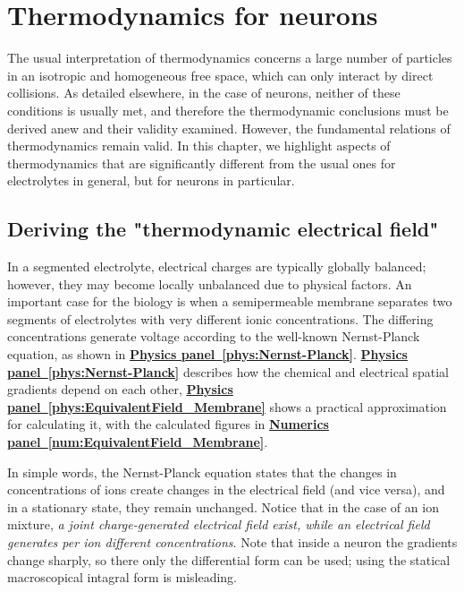 
\chapter{Thermodynamics for neurons\label{ch:Thermodynamics}}
\iflatexml
\else
\minitoc
\fi


The usual interpretation of thermodynamics concerns a large number of particles in an isotropic and homogeneous free space, which can only interact by direct collisions. As detailed elsewhere, in the case of neurons, neither of these conditions is usually met, and therefore the thermodynamic conclusions must be derived anew and their validity examined. However, the fundamental relations of thermodynamics remain valid. In this chapter, we highlight aspects of thermodynamics that are significantly different from the usual ones for electrolytes in general, but for neurons in particular.

\section[Thermodynamic field]{Deriving the "thermodynamic electrical field"\label{sec:Physics-ThermodynamicField}}

In a segmented electrolyte, electrical charges are typically globally balanced;
however, they may become locally unbalanced due to physical factors.
An important case for the biology is when a semipermeable membrane
separates two segments of electrolytes with very different ionic concentrations. 
The differing concentrations generate voltage according to the 
well-known  Nernst-Planck equation, as shown in
\hyperlink{phys:Nernst-Planck}
{\textbf{Physics panel~\ref{phys:Nernst-Planck}}}.
\hyperlink{phys:Nernst-Planck}
{\textbf{Physics panel~\ref{phys:Nernst-Planck}}}
describes how the chemical and
electrical spatial gradients depend on each other,
\hyperlink{phys:EquivalentField_Membrane}
{\textbf{Physics panel~\ref{phys:EquivalentField_Membrane}}}
shows a practical approximation for calculating it, with 
the calculated figures in 
\hyperlink{num:EquivalentField_Membrane}
{\textbf{Numerics panel~\ref{num:EquivalentField_Membrane}}}.


In simple words, the Nernst-Planck equation states that the changes in
concentrations of ions create changes in the electrical field (and
vice versa), and in a stationary state, they remain unchanged.
Notice that in the case of an ion mixture, \textit{a joint charge-generated electrical field exist, while an electrical field generates
per ion different concentrations}.
Note that inside a neuron the gradients change sharply,
so there only the differential form can be used;
using the statical macroscopical intagral form is misleading.


